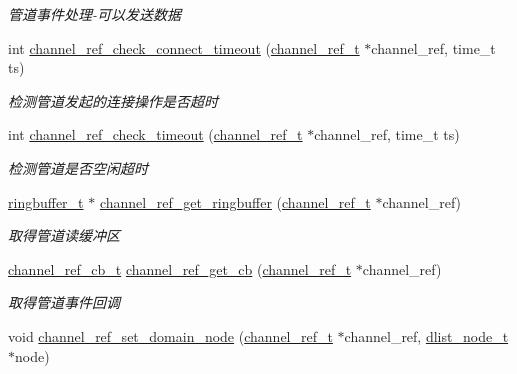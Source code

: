 \begin{DoxyCompactItemize}
\begin{DoxyCompactList}\small\item\em 管道事件处理-\/可以发送数据 \end{DoxyCompactList}\item 
int \hyperlink{a00045_a1f03dc2b266c99aa3189dbe02564be45_a1f03dc2b266c99aa3189dbe02564be45}{channel\+\_\+ref\+\_\+check\+\_\+connect\+\_\+timeout} (\hyperlink{a00047_a151271c9d188ef28d4d24bb81dcc1263_a151271c9d188ef28d4d24bb81dcc1263}{channel\+\_\+ref\+\_\+t} $\ast$channel\+\_\+ref, time\+\_\+t ts)
\begin{DoxyCompactList}\small\item\em 检测管道发起的连接操作是否超时 \end{DoxyCompactList}\item 
int \hyperlink{a00045_ae0c46cab3e683bce5f93d07847db7ec1_ae0c46cab3e683bce5f93d07847db7ec1}{channel\+\_\+ref\+\_\+check\+\_\+timeout} (\hyperlink{a00047_a151271c9d188ef28d4d24bb81dcc1263_a151271c9d188ef28d4d24bb81dcc1263}{channel\+\_\+ref\+\_\+t} $\ast$channel\+\_\+ref, time\+\_\+t ts)
\begin{DoxyCompactList}\small\item\em 检测管道是否空闲超时 \end{DoxyCompactList}\item 
\hyperlink{a00047_af929c5cf86b6a0f64dde407dfe60482e_af929c5cf86b6a0f64dde407dfe60482e}{ringbuffer\+\_\+t} $\ast$ \hyperlink{a00045_a7f81588a2beaa8c33a5eb7bf2236e566_a7f81588a2beaa8c33a5eb7bf2236e566}{channel\+\_\+ref\+\_\+get\+\_\+ringbuffer} (\hyperlink{a00047_a151271c9d188ef28d4d24bb81dcc1263_a151271c9d188ef28d4d24bb81dcc1263}{channel\+\_\+ref\+\_\+t} $\ast$channel\+\_\+ref)
\begin{DoxyCompactList}\small\item\em 取得管道读缓冲区 \end{DoxyCompactList}\item 
\hyperlink{a00047_ae296ec4d1ce108960de8dcc423956a1d_ae296ec4d1ce108960de8dcc423956a1d}{channel\+\_\+ref\+\_\+cb\+\_\+t} \hyperlink{a00045_a1495c5893bdd3bf7508c0d13c7a591a6_a1495c5893bdd3bf7508c0d13c7a591a6}{channel\+\_\+ref\+\_\+get\+\_\+cb} (\hyperlink{a00047_a151271c9d188ef28d4d24bb81dcc1263_a151271c9d188ef28d4d24bb81dcc1263}{channel\+\_\+ref\+\_\+t} $\ast$channel\+\_\+ref)
\begin{DoxyCompactList}\small\item\em 取得管道事件回调 \end{DoxyCompactList}\item 
void \hyperlink{a00045_a31d88025a8c93858b7784ce1f89cfffe_a31d88025a8c93858b7784ce1f89cfffe}{channel\+\_\+ref\+\_\+set\+\_\+domain\+\_\+node} (\hyperlink{a00047_a151271c9d188ef28d4d24bb81dcc1263_a151271c9d188ef28d4d24bb81dcc1263}{channel\+\_\+ref\+\_\+t} $\ast$channel\+\_\+ref, \hyperlink{a00047_a62053232bcf3566010ef98a7d77c3cc8_a62053232bcf3566010ef98a7d77c3cc8}{dlist\+\_\+node\+\_\+t} $\ast$node)

\end{DoxyCompactItemize}
